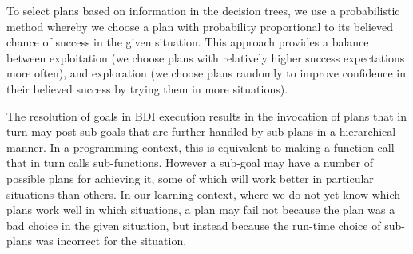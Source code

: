 To select plans based on information in the decision trees, we use a
probabilistic method whereby we choose a plan with
probability proportional to its believed chance of success in the
given situation. This approach provides a balance between
exploitation (we choose plans with relatively higher success expectations
more often), and exploration (we choose plans randomly to improve
confidence in their believed success by trying them in more 
situations).

The resolution of goals in BDI execution results in 
the invocation of plans that in turn may post sub-goals that are further
handled by sub-plans in a hierarchical manner. In a programming context,
this is equivalent to making a function call that in turn calls sub-functions.
However a sub-goal may have a number of possible plans for achieving
it, some of which will work better in particular situations than
others. In our learning context, where we do not yet know which plans
work well in which situations, a plan may fail not because the plan
was a bad choice in the given situation, but instead because the
run-time choice of sub-plans was incorrect for the situation.



